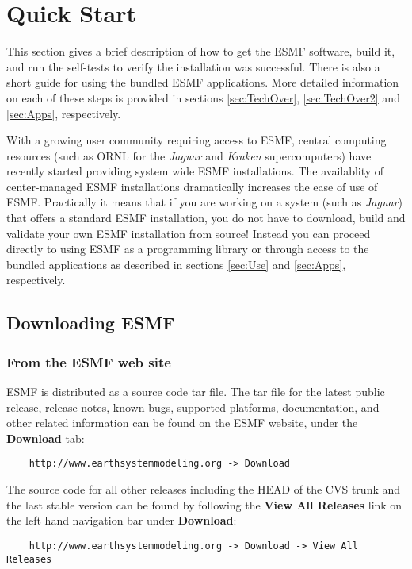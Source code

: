 \section{Quick Start}
\label{sec:QuickStart}

This section gives a brief description of how to get the ESMF software, build 
it, and run the self-tests to verify the installation was successful. There is 
also a short guide for using the bundled ESMF applications. More detailed 
information on each of these steps is provided in sections \ref{sec:TechOver},
 \ref{sec:TechOver2} and \ref{sec:Apps}, respectively.

With a growing user community requiring access to ESMF, central computing 
resources (such as ORNL for the {\it Jaguar} and {\it Kraken} supercomputers) 
have recently started providing system wide ESMF installations. The availablity 
of center-managed ESMF installations dramatically increases the ease of use of 
ESMF. Practically it means that if you are working on a system (such as 
{\it Jaguar}) that offers a standard ESMF installation, you do not have to 
download, build and validate your own ESMF installation from source! Instead you 
can proceed directly to using ESMF as a programming library or through access to 
the bundled applications as described in sections \ref{sec:Use} and 
\ref{sec:Apps}, respectively.

\subsection{Downloading ESMF}
\subsubsection{From the ESMF web site}
\label{sec:download}
ESMF is distributed as a source code tar file.  The tar file for the latest
public release, release notes, 
known bugs, supported platforms, documentation, and other related information 
can be found on the ESMF website, under the {\bf Download} tab:
\begin{verbatim}
    http://www.earthsystemmodeling.org -> Download
\end{verbatim}
The source code for all other releases including the HEAD of the CVS trunk and the
last stable version can be found by following the {\bf View All Releases} link on the left hand navigation bar under {\bf Download}:
\begin{verbatim}
    http://www.earthsystemmodeling.org -> Download -> View All Releases
\end{verbatim}

